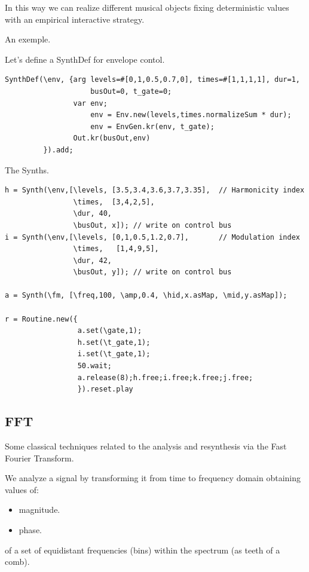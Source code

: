 In this way we can realize different musical objects fixing deterministic values with an empirical interactive strategy.

An exemple. 

Let's define a SynthDef for envelope contol.

\begin{lstlisting}[frame=single, caption=Envelope control model] 
SynthDef(\env, {arg levels=#[0,1,0.5,0.7,0], times=#[1,1,1,1], dur=1, 
                    busOut=0, t_gate=0;
                var env;
                    env = Env.new(levels,times.normalizeSum * dur);
                    env = EnvGen.kr(env, t_gate);
                Out.kr(busOut,env)
         }).add;
\end{lstlisting}

The Synths.

\begin{lstlisting}[frame=single] 
h = Synth(\env,[\levels, [3.5,3.4,3.6,3.7,3.35],  // Harmonicity index
                \times,  [3,4,2,5],
                \dur, 40,
                \busOut, x]); // write on control bus
i = Synth(\env,[\levels, [0,1,0.5,1.2,0.7],       // Modulation index
                \times,   [1,4,9,5],
                \dur, 42,
                \busOut, y]); // write on control bus

a = Synth(\fm, [\freq,100, \amp,0.4, \hid,x.asMap, \mid,y.asMap]);
                
r = Routine.new({
                 a.set(\gate,1);
                 h.set(\t_gate,1); 
                 i.set(\t_gate,1);
                 50.wait; 
                 a.release(8);h.free;i.free;k.free;j.free;
                 }).reset.play
\end{lstlisting}

\subsection{FFT}\label{fft}

Some classical techniques related to the analysis and resynthesis via the Fast Fourier Transform.

We analyze a signal by transforming it from time to frequency domain obtaining values of:

\begin{itemize}
\tightlist 
\item magnitude.
\item phase.
\end{itemize}

of a set of equidistant frequencies (bins) within the spectrum (as teeth of a comb).

